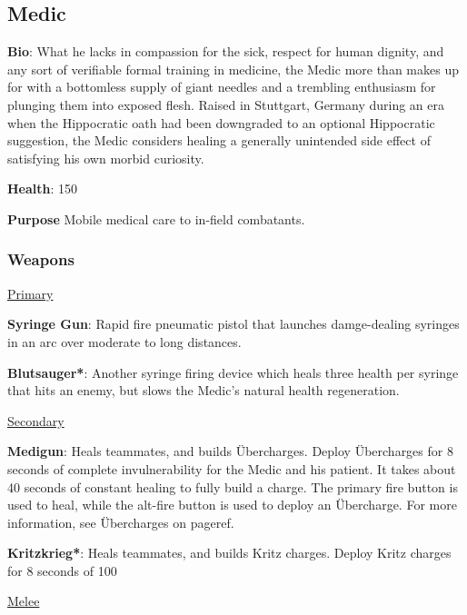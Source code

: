 \subsection{Medic}
{\bf Bio}:
What he lacks in compassion for the sick, respect for human dignity, and any sort of verifiable formal training in medicine, the Medic more than makes up for with a bottomless supply of giant needles and a trembling enthusiasm for plunging them into exposed flesh. Raised in Stuttgart, Germany during an era when the Hippocratic oath had been downgraded to an optional Hippocratic suggestion, the Medic considers healing a generally unintended side effect of satisfying his own morbid curiosity.

{\bf Health}: 150

{\bf Purpose}
Mobile medical care to in-field combatants.  

\subsubsection {Weapons}

\begin {center}
\underline {Primary}
\end {center}

{\bf Syringe Gun}: Rapid fire pneumatic pistol that launches damge-dealing syringes in an arc over moderate to long distances.

{\bf Blutsauger*}: Another syringe firing device which heals three health per syringe that hits an enemy, but slows the Medic's natural health regeneration. 


\begin {center}
\underline {Secondary}
\end {center}

{\bf Medigun}: Heals teammates, and builds Übercharges. Deploy Übercharges for 8 seconds of complete invulnerability for the Medic and his patient. It takes about 40 seconds of constant healing to fully build a charge. The primary fire button is used to heal, while the alt-fire button is used to deploy an Übercharge. For more information, see Übercharges on {{pageref}}. 

{\bf Kritzkrieg*}: Heals teammates, and builds Kritz charges. Deploy Kritz charges for 8 seconds of 100%


\begin {center}
\underline {Melee}
\end {center}


